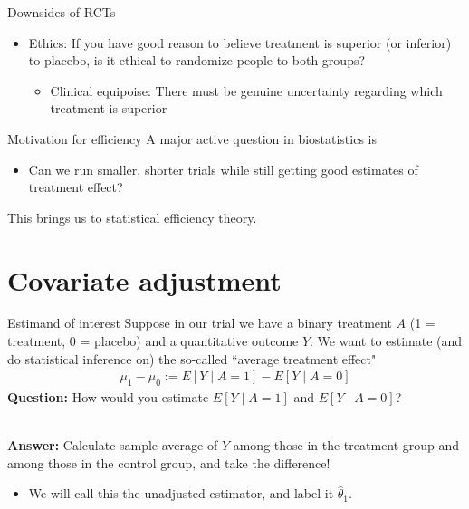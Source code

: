 \documentclass[10pt,t]{beamer}
\begin{document}
\begin{frame}{Downsides of RCTs}
	\begin{itemize}
		\item Ethics: If you have good reason to believe treatment is superior (or inferior) to placebo, is it ethical to randomize people to both groups?
		\begin{itemize}
			\item Clinical equipoise: There must be genuine uncertainty regarding which treatment is superior
		\end{itemize}
	\end{itemize}
\end{frame}

\begin{frame}{Motivation for efficiency}
	A major active question in biostatistics is
	\begin{itemize}
		\item Can we run smaller, shorter trials while still getting good estimates of treatment effect?
	\end{itemize}
	This brings us to statistical efficiency theory. 
\end{frame}

\section{Covariate adjustment}

\begin{frame}{Estimand of interest}
	Suppose in our trial we have a binary treatment $A$ (1 = treatment, 0 = placebo) and a quantitative outcome $Y$. We want to estimate (and do statistical inference on) the so-called ``average treatment effect" 
	\begin{align*}
		\mu_1 - \mu_0 := E[Y \mid A = 1] - E[Y \mid A = 0]
	\end{align*}
	\textbf{Question:} How would you estimate $E[Y \mid A = 1]$ and $E[Y \mid A = 0]$?\pause 
	\\ ~\ 
	
	\textbf{Answer:} Calculate sample average of $Y$ among those in the treatment group and among those in the control group, and take the difference!
	\begin{itemize}
		\item We will call this the unadjusted estimator, and label it $\hat{\theta}_1$. 
	\end{itemize}
\end{frame}
\end{document}
